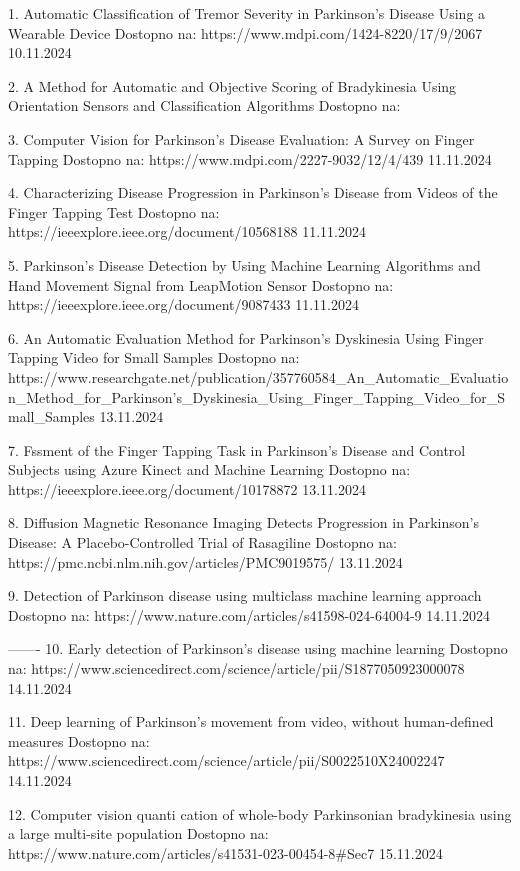 1. Automatic Classification of Tremor Severity in Parkinson’s Disease Using a Wearable Device
Dostopno na: https://www.mdpi.com/1424-8220/17/9/2067
10.11.2024

2. A Method for Automatic and Objective Scoring of Bradykinesia Using Orientation Sensors and Classification Algorithms
Dostopno na: 

3. Computer Vision for Parkinson’s Disease Evaluation: A Survey on Finger Tapping
Dostopno na: https://www.mdpi.com/2227-9032/12/4/439
11.11.2024

4. Characterizing Disease Progression in Parkinson’s Disease from Videos of the Finger Tapping Test
Dostopno na: https://ieeexplore.ieee.org/document/10568188
11.11.2024

5. Parkinson’s Disease Detection by Using Machine Learning Algorithms and Hand Movement Signal from LeapMotion Sensor
Dostopno na: https://ieeexplore.ieee.org/document/9087433
11.11.2024

6. An Automatic Evaluation Method for Parkinson's Dyskinesia Using Finger Tapping Video for Small Samples
Dostopno na: https://www.researchgate.net/publication/357760584_An_Automatic_Evaluation_Method_for_Parkinson's_Dyskinesia_Using_Finger_Tapping_Video_for_Small_Samples 
13.11.2024

7. Fssment of the Finger Tapping Task in Parkinson’s Disease and Control Subjects using Azure Kinect and Machine Learning
Dostopno na: https://ieeexplore.ieee.org/document/10178872
13.11.2024

8. Diffusion Magnetic Resonance Imaging Detects Progression in Parkinson’s Disease: A Placebo-Controlled Trial of Rasagiline
Dostopno na: https://pmc.ncbi.nlm.nih.gov/articles/PMC9019575/
13.11.2024

9. Detection of Parkinson disease using multiclass machine learning approach
Dostopno na: https://www.nature.com/articles/s41598-024-64004-9
14.11.2024

-------
10. Early detection of Parkinson’s disease using machine learning
Dostopno na: https://www.sciencedirect.com/science/article/pii/S1877050923000078
14.11.2024

11. Deep learning of Parkinson's movement from video, without human-defined measures
Dostopno na: https://www.sciencedirect.com/science/article/pii/S0022510X24002247
14.11.2024

12. Computer vision quanti cation of whole-body Parkinsonian bradykinesia using a large multi-site population
Dostopno na: https://www.nature.com/articles/s41531-023-00454-8#Sec7
15.11.2024

